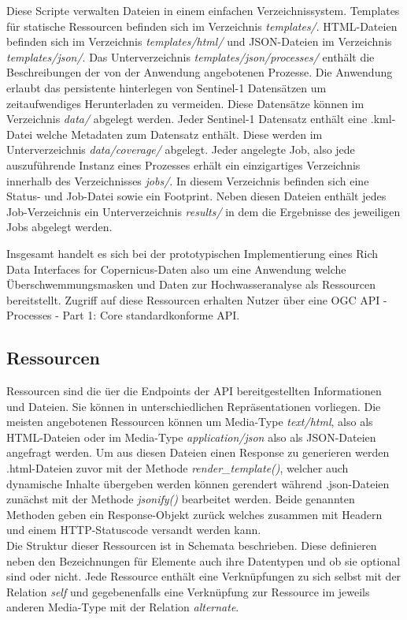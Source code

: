 Diese Scripte verwalten Dateien in einem einfachen Verzeichnissystem. Templates für statische Ressourcen befinden sich im Verzeichnis \textit{templates/}. HTML-Dateien 
befinden sich im Verzeichnis \textit{templates/html/} und JSON-Dateien im Verzeichnis \textit{templates/json/}. Das Unterverzeichnis \textit{templates/json/processes/} enthält die 
Beschreibungen der von der Anwendung angebotenen Prozesse. 
Die Anwendung erlaubt das persistente hinterlegen von Sentinel-1 Datensätzen um zeitaufwendiges Herunterladen zu vermeiden. Diese Datensätze können im Verzeichnis \textit{data/} abgelegt werden. Jeder Sentinel-1 Datensatz enthält eine .kml-Datei welche 
Metadaten zum Datensatz enthält. Diese werden im Unterverzeichnis \textit{data/coverage/} abgelegt. 
Jeder angelegte Job, also jede auszuführende Instanz eines Prozesses erhält ein einzigartiges Verzeichnis innerhalb des Verzeichnisses \textit{jobs/}. In diesem 
Verzeichnis befinden sich eine Status- und Job-Datei sowie ein Footprint. Neben diesen Dateien enthält jedes Job-Verzeichnis ein Unterverzeichnis \textit{results/} in dem
die Ergebnisse des jeweiligen Jobs abgelegt werden.

Insgesamt handelt es sich bei der prototypischen Implementierung eines Rich Data Interfaces for Copernicus-Daten also um eine Anwendung welche Überschwemmungsmasken und Daten zur Hochwasseranalyse als Ressourcen bereitstellt.
Zugriff auf diese Ressourcen erhalten Nutzer über eine OGC API - Processes - Part 1: Core standardkonforme API. 

\subsection{Ressourcen}
Ressourcen sind die üer die Endpoints der API bereitgestellten Informationen und Dateien. Sie können in unterschiedlichen Repräsentationen vorliegen.
Die meisten angebotenen Ressourcen können um Media-Type \textit{text/html}, also als HTML-Dateien oder im Media-Type \textit{application/json} also als 
JSON-Dateien angefragt werden. Um aus diesen Dateien einen Response zu generieren werden .html-Dateien zuvor mit der Methode \textit{render\_template()}, welcher auch 
dynamische Inhalte übergeben werden können gerendert während .json-Dateien zunächst mit der Methode \textit{jsonify()} bearbeitet werden. Beide genannten Methoden
geben ein Response-Objekt zurück welches zusammen mit Headern und einem HTTP-Statuscode versandt werden kann. \\

Die Struktur dieser Ressourcen ist in Schemata beschrieben. Diese definieren neben den Bezeichnungen für Elemente auch ihre Datentypen und 
ob sie optional sind oder nicht. Jede Ressource enthält eine Verknüpfungen zu sich selbst mit der Relation \textit{self} und gegebenenfalls eine Verknüpfung 
zur Ressource im jeweils anderen Media-Type mit der Relation \textit{alternate}. 

